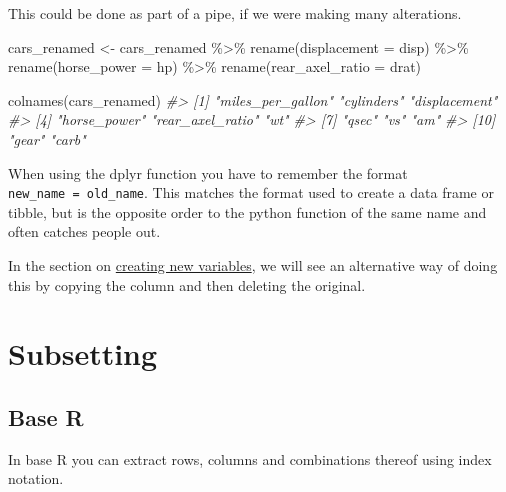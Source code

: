 \documentclass[
  12pt,
]{book}
\newenvironment{Shaded}{\begin{snugshade}}{\end{snugshade}}
\newcommand{\AttributeTok}[1]{\textcolor[rgb]{0.77,0.63,0.00}{#1}}
\newcommand{\CommentTok}[1]{\textcolor[rgb]{0.56,0.35,0.01}{\textit{#1}}}
\newcommand{\FunctionTok}[1]{\textcolor[rgb]{0.00,0.00,0.00}{#1}}
\newcommand{\NormalTok}[1]{#1}
\newcommand{\OtherTok}[1]{\textcolor[rgb]{0.56,0.35,0.01}{#1}}
\newcommand{\SpecialCharTok}[1]{\textcolor[rgb]{0.00,0.00,0.00}{#1}}
\begin{document}
This could be done as part of a pipe, if we were making many alterations.

\begin{Shaded}
\begin{Highlighting}[]
\NormalTok{cars\_renamed }\OtherTok{\textless{}{-}}\NormalTok{ cars\_renamed }\SpecialCharTok{\%\textgreater{}\%} 
  \FunctionTok{rename}\NormalTok{(}\AttributeTok{displacement =}\NormalTok{ disp) }\SpecialCharTok{\%\textgreater{}\%} 
  \FunctionTok{rename}\NormalTok{(}\AttributeTok{horse\_power =}\NormalTok{ hp) }\SpecialCharTok{\%\textgreater{}\%} 
  \FunctionTok{rename}\NormalTok{(}\AttributeTok{rear\_axel\_ratio =}\NormalTok{ drat)}

\FunctionTok{colnames}\NormalTok{(cars\_renamed)}
\CommentTok{\#\textgreater{}  [1] "miles\_per\_gallon" "cylinders"        "displacement"    }
\CommentTok{\#\textgreater{}  [4] "horse\_power"      "rear\_axel\_ratio"  "wt"              }
\CommentTok{\#\textgreater{}  [7] "qsec"             "vs"               "am"              }
\CommentTok{\#\textgreater{} [10] "gear"             "carb"}
\end{Highlighting}
\end{Shaded}

When using the dplyr function you have to remember the format \texttt{new\_name\ =\ old\_name}. This matches the format used to create a data frame or tibble, but is the opposite order to the python function of the same name and often catches people out.

In the section on \protect\hyperlink{creating-new-variables}{creating new variables}, we will see an alternative way of doing this by copying the column and then deleting the original.

\hypertarget{subsetting-1}{%
\section{Subsetting}\label{subsetting-1}}

\hypertarget{base-r-1}{%
\subsection{Base R}\label{base-r-1}}

In base R you can extract rows, columns and combinations thereof using index notation.
\end{document}
